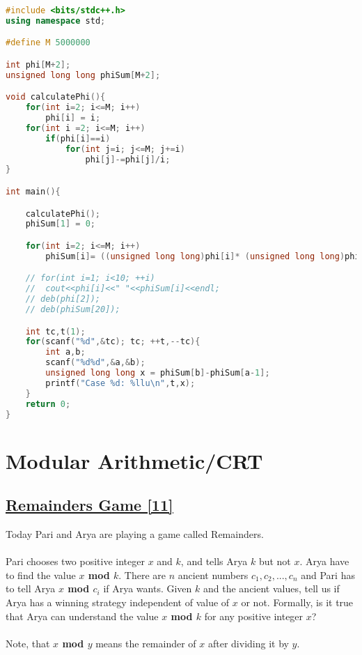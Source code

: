 \documentclass[10pt,a4paper]{article}
\begin{document}
\begin{itemize}
\begin{lstlisting}[language=C++, caption={Mathematically Hard}, label={1st:code}, mathescape=true, breaklines=true]
#include <bits/stdc++.h>
using namespace std;

#define M 5000000

int phi[M+2];
unsigned long long phiSum[M+2];

void calculatePhi(){
    for(int i=2; i<=M; i++)
        phi[i] = i;
    for(int i =2; i<=M; i++)
        if(phi[i]==i)
            for(int j=i; j<=M; j+=i)
                phi[j]-=phi[j]/i;
}

int main(){

    calculatePhi();
    phiSum[1] = 0;

    for(int i=2; i<=M; i++)
        phiSum[i]= ((unsigned long long)phi[i]* (unsigned long long)phi[i])+phiSum[i-1];

    // for(int i=1; i<10; ++i)
    //  cout<<phi[i]<<" "<<phiSum[i]<<endl;
    // deb(phi[2]);
    // deb(phiSum[20]);

    int tc,t(1);
    for(scanf("%d",&tc); tc; ++t,--tc){
        int a,b;
        scanf("%d%d",&a,&b);
        unsigned long long x = phiSum[b]-phiSum[a-1];
        printf("Case %d: %llu\n",t,x);
    }
    return 0;
}

\end{lstlisting}

\section{Modular Arithmetic/CRT}
\subsection*{\href{https://codeforces.com/problemset/problem/687/B}{\underline{Remainders Game [11]}}}
Today Pari and Arya are playing a game called Remainders.
\\ \\
Pari chooses two positive integer $x$ and $k$, and tells Arya $k$ but not $x$. Arya have to find the value \textbf{$x$ mod $k$}. There are $n$ ancient numbers $c_1,c_2,...,c_n$ and Pari has to tell Arya \textbf{$x$ mod $c_i$} if Arya wants. Given $k$ and the ancient values, tell us if Arya has a winning strategy independent of value of $x$ or not. Formally, is it true that Arya can understand the value \textbf{$x$ mod $k$} for any positive integer $x$?
\\ \\
Note, that \textbf{$x$ mod $y$} means the remainder of $x$ after dividing it by $y$.


\end{itemize}
\end{document}
